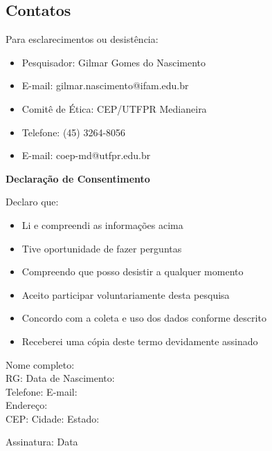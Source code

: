 \documentclass[12pt,a4paper]{article}
\begin{document}
	\subsection{Contatos}
	Para esclarecimentos ou desistência:
	\begin{itemize}
		\item Pesquisador: Gilmar Gomes do Nascimento
		\item E-mail: gilmar.nascimento@ifam.edu.br
		\item Comitê de Ética: CEP/UTFPR Medianeira
		\item Telefone: (45) 3264-8056
		\item E-mail: coep-md@utfpr.edu.br
	\end{itemize}
	
	\vspace{2em}
	\begin{center}
		\textbf{Declaração de Consentimento}
	\end{center}
	
	\noindent Declaro que:
	\begin{itemize}
		\item Li e compreendi as informações acima
		\item Tive oportunidade de fazer perguntas
		\item Compreendo que posso desistir a qualquer momento
		\item Aceito participar voluntariamente desta pesquisa
		\item Concordo com a coleta e uso dos dados conforme descrito
		\item Receberei uma cópia deste termo devidamente assinado
	\end{itemize}
	
	\vspace{2em}

\noindent Nome completo: \vspace{1.4em}\makebox[5.5in]{\hrulefill} \\ 
\noindent \vspace{1.6em}RG: \makebox[2.5in]{\hrulefill}  Data de Nascimento: \makebox[2.3in]{\hrulefill}  \\
\noindent \vspace{1.6em}Telefone: \makebox[1.8in]{\hrulefill} E-mail: \makebox[3.5in]{\hrulefill}\\
\noindent \vspace{1.6em}Endereço: \makebox[5.9in]{\hrulefill} \\
\noindent \vspace{1.6em}CEP: \makebox[1.5in]{\hrulefill} Cidade: \makebox[3in]{\hrulefill} Estado: \makebox[0.5in]{\hrulefill}

\vspace{1.3cm}

\noindent Assinatura: \makebox[4in]{\hrulefill}  Data \makebox[1.3in]{\hrulefill}
\end{document}
